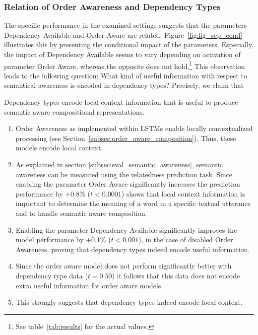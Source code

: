 \subsubsection{Relation of Order Awareness and Dependency Types}
The specific performance in the examined settings suggests that the parameters Dependency Available and Order Aware are related. Figure~\ref{fig:fig_sep_cond} illustrates this by presenting the conditional impact of the parameters. Especially, the impact of Dependency Available seems to vary depending on activation of parameter Order Aware, whereas the opposite does not hold.\footnote{See table~\ref{tab:results} for the actual values.} This observation leads to the following question: What kind of useful information with respect to semantical awareness is encoded in dependency types? Precisely, we claim that

\begin{claim}
	Dependency types encode local context information that is useful to produce semantic aware compositional representations.
\end{claim}	

\begin{Proof}
	\begin{enumerate}
		\item Order Awareness as implemented within \ac{LSTM}s enable locally contextualized processing (see Section~\ref{subsec:order_aware_composition}). Thus, these models encode local context.
		\item As explained in section \ref{subsec:eval_semantic_awareness}, semantic awareness can be measured using the relatedness prediction task. Since enabling the parameter Order Aware significantly increases the prediction performance by $+0.8\%$ ($t < 0.0001$) shows that local context information is important to determine the meaning of a word in a specific textual utterance and to handle semantic aware composition.
		\item Enabling the parameter Dependency Available significantly improves the model performance by $+0.1\%$ ($t < 0.001$), in the case of disabled Order Awareness, proving that dependency types indeed encode useful information.
		\item Since the order aware model does not perform significantly better with dependency type data ($t = 0.50$) it follows that this data does not encode extra useful information for order aware models.
		\item This strongly suggests that dependency types indeed encode local context.
	\end{enumerate}
\end{Proof}

